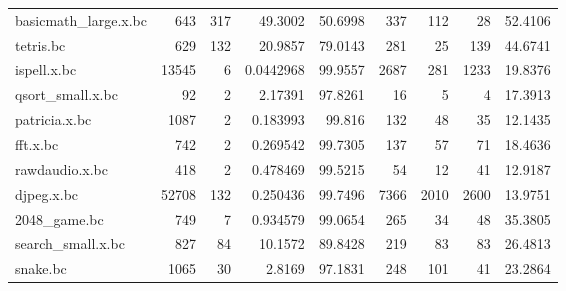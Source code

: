 \begin{table}[ht]
\begin{adjustbox}{width=1.3\textwidth}
\begin{tabular}{lrrrrrrrr}
 basicmath\_large.x.bc &           643 &                 317 &     49.3002    &       50.6998 &                337 &                              112 &                          28 &       52.4106  \\
 tetris.bc            &           629 &                 132 &     20.9857    &       79.0143 &                281 &                               25 &                         139 &       44.6741  \\
 ispell.x.bc          &         13545 &                   6 &      0.0442968 &       99.9557 &               2687 &                              281 &                        1233 &       19.8376  \\
 qsort\_small.x.bc     &            92 &                   2 &      2.17391   &       97.8261 &                 16 &                                5 &                           4 &       17.3913  \\
 patricia.x.bc        &          1087 &                   2 &      0.183993  &       99.816  &                132 &                               48 &                          35 &       12.1435  \\
 fft.x.bc             &           742 &                   2 &      0.269542  &       99.7305 &                137 &                               57 &                          71 &       18.4636  \\
 rawdaudio.x.bc       &           418 &                   2 &      0.478469  &       99.5215 &                 54 &                               12 &                          41 &       12.9187  \\
 djpeg.x.bc           &         52708 &                 132 &      0.250436  &       99.7496 &               7366 &                             2010 &                        2600 &       13.9751  \\
 2048\_game.bc         &           749 &                   7 &      0.934579  &       99.0654 &                265 &                               34 &                          48 &       35.3805  \\
 search\_small.x.bc    &           827 &                  84 &     10.1572    &       89.8428 &                219 &                               83 &                          83 &       26.4813  \\
 snake.bc             &          1065 &                  30 &      2.8169    &       97.1831 &                248 &                              101 &                          41 &       23.2864  \\

\end{tabular}
\end{adjustbox}
\end{table}
